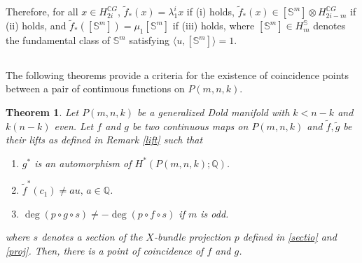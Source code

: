 \documentclass{amsart}
\newtheorem{theorem}{Theorem}[section]
\begin{document}
Therefore, for all $x\in H_{2i}^{\mathbb CG}$, $\tilde f_*(x)=\lambda_1^ix$ if (i) holds, $\tilde f_*(x)\in [\mathbb S^m]\otimes H_{2i-m}^{\mathbb CG}$ if (ii) holds, and $\tilde f_*([\mathbb S^m])=\mu_1 [\mathbb S^m]$ if (iii) holds, where $[\mathbb S^m]\in H_m^{\mathbb S}$ denotes the fundamental class of $\mathbb S^m$ satisfying $\langle u,[\mathbb S^m]\rangle=1.$
\fi


\subsection{} The following theorems provide a criteria for the existence of coincidence points between a pair of continuous functions on $P(m,n,k)$.

\begin{theorem}\label{coincidence thm}
	Let $P(m,n,k)$ be a generalized Dold manifold with $k<n-k$ and $k(n-k)$ even. Let $f$ and $g$ be two continuous maps on $P(m,n,k)$ and $\tilde f, \tilde g$ be their lifts as defined in  Remark \ref{lift} such that
	\begin{enumerate}	
		\item $g^*$ is an automorphism of $H^*(P(m,n,k);\mathbb Q)$. 
		\item $\tilde{f}^*(c_1) \neq au,\, a \in \mathbb{Q}$.
		\item $\deg(p\circ g \circ s)\neq -\deg (p\circ f\circ s)$ if $m$ is odd.
	\end{enumerate}
	where $s$ denotes a section of the $X$-bundle projection $p$ defined in \eqref{sectio} and \eqref{proj}.	Then, there is a point of coincidence of $f$ and  $g$.
\end{theorem}
\end{document}
